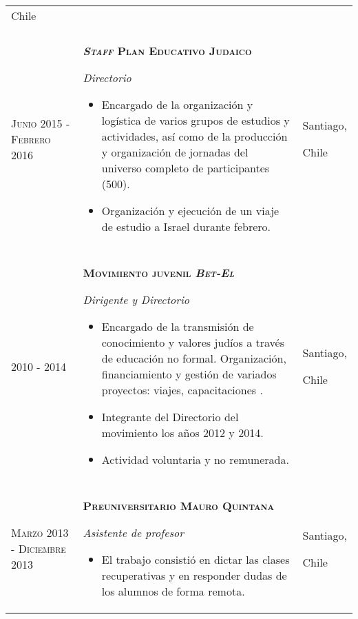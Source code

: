 \documentclass[a4paper,10pt]{article}
\begin{document}
\begin{tabular}{p{2 cm}|p{11cm}|p{2cm}}
Chile
\\

&\\

\textsc{Junio} 2015 -
\textsc{Febrero} 2016  &

\textbf{\textsc{\textit{Staff} Plan Educativo Judaico}}

\textit{Directorio}

\begin{itemize}
	\item Encargado de la organización y logística de varios grupos de estudios y actividades, así como de la producción y organización de jornadas del universo completo de
participantes (500).
	\item Organización y ejecución de un viaje de estudio a Israel durante febrero. 
\end{itemize}
&
Santiago, 

Chile
\\

&\\

2010 -
2014 &

\textbf{\textsc{Movimiento juvenil \textit{Bet-El}}}

\textit{Dirigente y Directorio}

\begin{itemize}
	\item Encargado de la transmisión de conocimiento y valores judíos a través de educación no formal. Organización, financiamiento y gestión de variados proyectos: viajes, capacitaciones .
	\item Integrante del Directorio del movimiento los años 2012 y 2014.
	\item Actividad voluntaria y no remunerada.
\end{itemize}
&
Santiago, 

Chile
\\

&\\

\textsc{Marzo} 2013 - \textsc{Diciembre} 2013 &

\textbf{\textsc{Preuniversitario Mauro Quintana}}

\textit{Asistente de profesor}

\begin{itemize}
	\item El trabajo consistió en dictar las clases recuperativas y en responder dudas de los alumnos de forma remota.
\end{itemize}
&
Santiago, 

Chile
\end{tabular}
\end{document}
